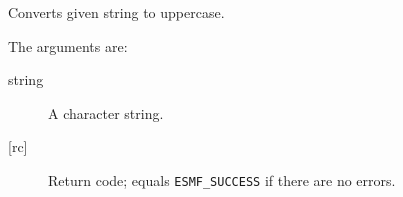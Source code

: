      Converts given string to uppercase.
  
       The arguments are:
       \begin{description}
       \item[string]
         A character string.
       \item[{[rc]}]
         Return code; equals {\tt ESMF\_SUCCESS} if there are no errors.
       \end{description}
  
  
\setlength{\parskip}{\oldparskip}
\setlength{\parindent}{\oldparindent}
\setlength{\baselineskip}{\oldbaselineskip}
